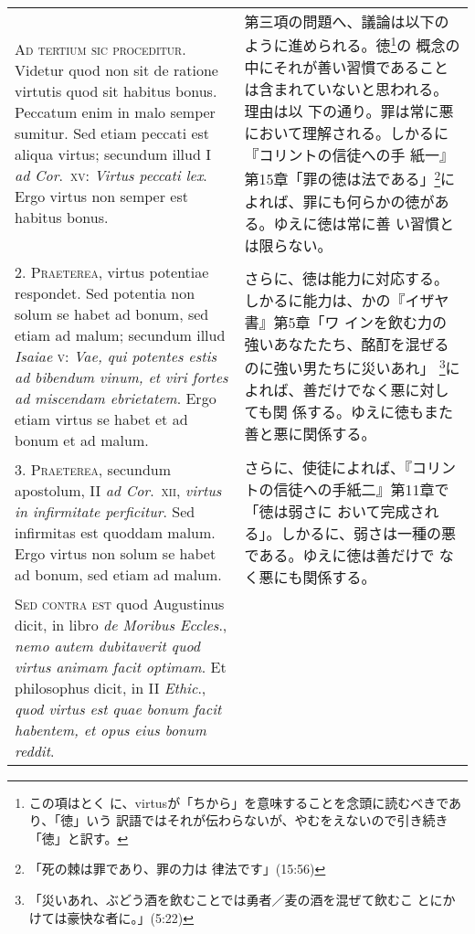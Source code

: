 \documentclass[10pt]{jsarticle}
\begin{document}
\begin{longtable}{p{21em}p{21em}}

{\scshape Ad tertium sic proceditur}. Videtur quod non sit de ratione
virtutis quod sit habitus bonus. Peccatum enim in malo semper
sumitur. Sed etiam peccati est aliqua virtus; secundum illud I
{\itshape ad Cor}.~{\scshape xv}: {\itshape Virtus peccati lex}. Ergo
virtus non semper est habitus bonus.

&

第三項の問題へ、議論は以下のように進められる。徳\footnote{この項はとく
に、virtusが「ちから」を意味することを念頭に読むべきであり、「徳」いう
訳語ではそれが伝わらないが、やむをえないので引き続き「徳」と訳す。}の
概念の中にそれが善い習慣であることは含まれていないと思われる。理由は以
下の通り。罪は常に悪において理解される。しかるに『コリントの信徒への手
紙一』第15章「罪の徳は法である」\footnote{「死の棘は罪であり、罪の力は
律法です」(15:56)}によれば、罪にも何らかの徳がある。ゆえに徳は常に善
い習慣とは限らない。

\\

2. {\scshape Praeterea}, virtus potentiae respondet. Sed potentia non
solum se habet ad bonum, sed etiam ad malum; secundum illud {\itshape
Isaiae} {\scshape v}: {\itshape Vae, qui potentes estis ad bibendum
vinum, et viri fortes ad miscendam ebrietatem}. Ergo etiam virtus se
habet et ad bonum et ad malum.

&

さらに、徳は能力に対応する。しかるに能力は、かの『イザヤ書』第5章「ワ
インを飲む力の強いあなたたち、酩酊を混ぜるのに強い男たちに災いあれ」
\footnote{「災いあれ、ぶどう酒を飲むことでは勇者／麦の酒を混ぜて飲むこ
とにかけては豪快な者に。」(5:22)}によれば、善だけでなく悪に対しても関
係する。ゆえに徳もまた善と悪に関係する。

\\

3. {\scshape Praeterea}, secundum apostolum, II {\itshape ad
Cor}.~{\scshape xii}, {\itshape virtus in infirmitate perficitur}. Sed
infirmitas est quoddam malum. Ergo virtus non solum se habet ad bonum,
sed etiam ad malum.

&

さらに、使徒によれば、『コリントの信徒への手紙二』第11章で「徳は弱さに
おいて完成される」。しかるに、弱さは一種の悪である。ゆえに徳は善だけで
なく悪にも関係する。

\\

{\scshape Sed contra est} quod Augustinus dicit, in libro {\itshape de
Moribus Eccles}., {\itshape nemo autem dubitaverit quod virtus animam
facit optimam}. Et philosophus dicit, in II {\itshape Ethic}.,
{\itshape quod virtus est quae bonum facit habentem, et opus eius
bonum reddit}.


\end{longtable}
\end{document}
